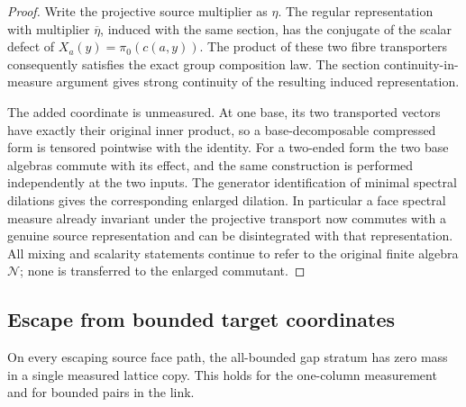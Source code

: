 \begin{proof}
Write the projective source multiplier as \(\eta\). The regular
representation with multiplier \(\overline\eta\), induced with
the same section, has the conjugate of the scalar defect of
\(X_a(y)=\pi_0(c(a,y))\). The product of these two fibre
transporters consequently satisfies the exact group composition
law. The section continuity-in-measure argument gives strong
continuity of the resulting induced representation.

The added coordinate is unmeasured. At one base, its two
transported vectors have exactly their original inner product,
so a base-decomposable compressed form is tensored pointwise with
the identity. For a two-ended form the two base algebras commute
with its effect, and the same construction is performed
independently at the two inputs. The generator identification of
minimal spectral dilations gives the corresponding enlarged
dilation. In particular a face spectral measure already invariant
under the projective transport now commutes with a genuine source
representation and can be disintegrated with that representation.
All mixing and scalarity statements continue to refer to the
original finite algebra \(\mathcal N\); none is transferred to
the enlarged commutant.
\end{proof}

\subsection{Escape from bounded target coordinates}

\begin{lemma}
\label{lem:links-no-bounded-stratum}
On every escaping source face path, the all-bounded gap stratum
has zero mass in a single measured lattice copy. This holds for
the one-column measurement and for bounded pairs in the link.
\end{lemma}

